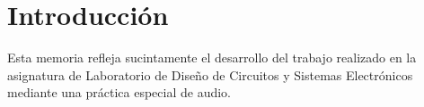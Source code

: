 \documentclass[a4paper, 12pt]{article}
\begin{document}
  

	
\newpage
\tableofcontents

\newpage
\listoffigures

\newpage
\section{Introducción}
	Esta memoria refleja sucintamente el desarrollo del trabajo realizado en la asignatura de Laboratorio de Diseño de Circuitos y Sistemas Electrónicos mediante una práctica especial de audio.

\newpage


\newpage


\newpage




	
\end{document}
